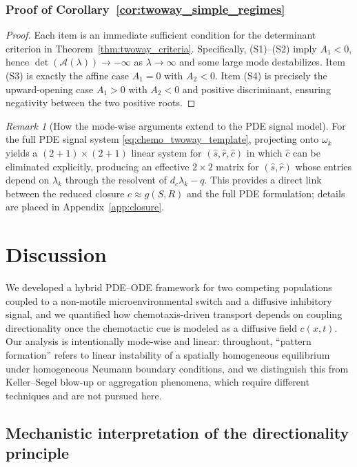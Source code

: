 \documentclass[pdflatex,sn-mathphys-ay]{sn-jnl}
\theoremstyle{thmstyleone}
\theoremstyle{definition}
\theoremstyle{remark}
\newtheorem{remark}[theorem]{Remark}
\begin{document}
\subsubsection*{Proof of Corollary~\ref{cor:twoway_simple_regimes}}
\begin{proof}
Each item is an immediate sufficient condition for the determinant criterion in Theorem~\ref{thm:twoway_criteria}.
Specifically, (S1)--(S2) imply $A_1<0$, hence $\det(\mathcal{A}(\lambda))\to -\infty$ as $\lambda\to\infty$ and some large mode destabilizes.
Item (S3) is exactly the affine case $A_1=0$ with $A_2<0$.
Item (S4) is precisely the upward-opening case $A_1>0$ with $A_2<0$ and positive discriminant, ensuring negativity between the two positive roots.
\end{proof}

\begin{remark}[How the mode-wise arguments extend to the PDE signal model]
For the full PDE signal system \eqref{eq:chemo_twoway_template}, projecting onto $\omega_k$ yields a $(2+1)\times(2+1)$ linear system for
$(\hat s,\hat r,\hat c)$ in which $\hat c$ can be eliminated explicitly, producing an effective $2\times2$ matrix for $(\hat s,\hat r)$ whose entries
depend on $\lambda_k$ through the resolvent of $d_c\lambda_k-q$. This provides a direct link between the reduced closure
$c\approx g(S,R)$ and the full PDE formulation; details are placed in Appendix~\ref{app:closure}.
\end{remark}

\section{Discussion}
\label{sec:discussion}

We developed a hybrid PDE--ODE framework for two competing populations coupled to a non-motile microenvironmental switch and a
diffusive inhibitory signal, and we quantified how chemotaxis-driven transport depends on coupling directionality once the
chemotactic cue is modeled as a diffusive field $c(x,t)$.
Our analysis is intentionally mode-wise and linear: throughout, ``pattern formation'' refers to linear instability of a spatially
homogeneous equilibrium under homogeneous Neumann boundary conditions, and we distinguish this from Keller--Segel blow-up or aggregation
phenomena, which require different techniques and are not pursued here.

\subsection{Mechanistic interpretation of the directionality principle}
\end{document}
